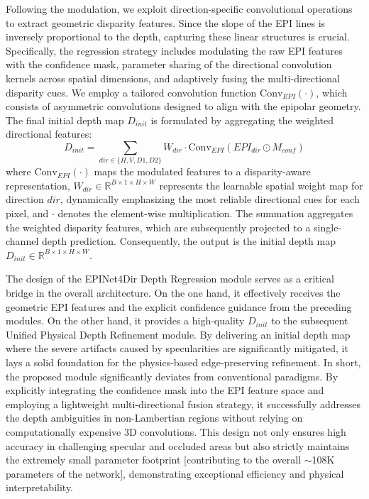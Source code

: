 \documentclass[lettersize,journal]{IEEEtran}
\begin{document}
Following the modulation, we exploit direction-specific convolutional operations to extract geometric disparity features. Since the slope of the EPI lines is inversely proportional to the depth, capturing these linear structures is crucial. Specifically, the regression strategy includes modulating the raw EPI features with the confidence mask, parameter sharing of the directional convolution kernels across spatial dimensions, and adaptively fusing the multi-directional disparity cues. We employ a tailored convolution function $\text{Conv}_{EPI}(\cdot)$, which consists of asymmetric convolutions designed to align with the epipolar geometry. The final initial depth map $D_{init}$ is formulated by aggregating the weighted directional features:
\begin{equation}
\label{eq:eq16}
D_{init} = \sum_{dir \in \{H, V, D1, D2\}} W_{dir} \cdot \text{Conv}_{EPI}(EPI_{dir} \odot M_{conf})
\end{equation}
where $\text{Conv}_{EPI}(\cdot)$ maps the modulated features to a disparity-aware representation, $W_{dir} \in \mathbb{R}^{B \times 1 \times H \times W}$ represents the learnable spatial weight map for direction $dir$, dynamically emphasizing the most reliable directional cues for each pixel, and $\cdot$ denotes the element-wise multiplication. The summation aggregates the weighted disparity features, which are subsequently projected to a single-channel depth prediction. Consequently, the output is the initial depth map $D_{init} \in \mathbb{R}^{B \times 1 \times H \times W}$.

The design of the EPINet4Dir Depth Regression module serves as a critical bridge in the overall architecture. On the one hand, it effectively receives the geometric EPI features and the explicit confidence guidance from the preceding modules. On the other hand, it provides a high-quality $D_{init}$ to the subsequent Unified Physical Depth Refinement module. By delivering an initial depth map where the severe artifacts caused by specularities are significantly mitigated, it lays a solid foundation for the physics-based edge-preserving refinement. In short, the proposed module significantly deviates from conventional paradigms. By explicitly integrating the confidence mask into the EPI feature space and employing a lightweight multi-directional fusion strategy, it successfully addresses the depth ambiguities in non-Lambertian regions without relying on computationally expensive 3D convolutions. This design not only ensures high accuracy in challenging specular and occluded areas but also strictly maintains the extremely small parameter footprint  [contributing to the overall $\sim$108K parameters of the network], demonstrating exceptional efficiency and physical interpretability.
\end{document}
